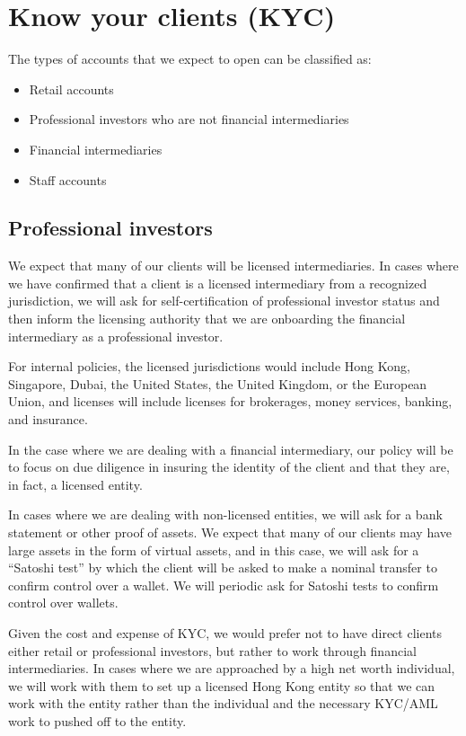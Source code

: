 \section{Know your clients (KYC)}

The types of accounts that we expect to open can be classified as:

\begin{itemize}
\item Retail accounts
\item Professional investors who are not financial intermediaries
\item Financial intermediaries
\item Staff accounts
  \end{itemize}

\subsection{Professional investors}
We expect that many of our clients will be licensed intermediaries.
In cases where we have confirmed that a client is a licensed
intermediary from a recognized jurisdiction, we will ask for
self-certification of professional investor status and then inform the
licensing authority that we are onboarding the financial intermediary
as a professional investor.

For internal policies, the licensed jurisdictions would
include Hong Kong, Singapore, Dubai, the United States, the United
Kingdom, or the European Union, and licenses will include licenses for
brokerages, money services, banking, and insurance.

In the case where we are dealing with a financial intermediary, our
policy will be to focus on due diligence in insuring the identity of
the client and that they are, in fact, a licensed entity.

In cases where we are dealing with non-licensed entities, we will ask
for a bank statement or other proof of assets.  We expect that many of
our clients may have large assets in the form of virtual assets, and
in this case, we will ask for a ``Satoshi test'' by which the client
will be asked to make a nominal transfer to confirm control over a
wallet.  We will periodic ask for Satoshi tests to confirm control
over wallets.

Given the cost and expense of KYC, we would prefer not to have direct
clients either retail or professional investors, but rather to work
through financial intermediaries.  In cases where we are approached by
a high net worth individual, we will work with them to set up a licensed
Hong Kong entity so that we can work with the entity rather than the
individual and the necessary KYC/AML work to pushed off to the entity.


